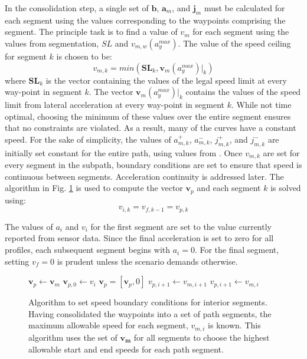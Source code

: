 \documentclass[letterpaper, 10 pt, conference]{ieeeconf}  %
\begin{document}
In the consolidation step, a single set of $\mathbf{b}$, $\mathbf{a}_m$, and $\mathbf{j}_m$ 
must be calculated for each segment using the values corresponding to the waypoints comprising the segment.
The principle task is to find a value of $v_m$ for each segment using the values from segmentation, $SL$ and $v_{m,w}(a_{y}^{max})$. 
The value of the speed ceiling for segment $k$ is chosen to be:
\begin{equation}
  v_{m,k} = min \left ( \mathbf{SL}_k ,  \mathbf{v}_{m}(a_{y}^{max}) |_k \right )
\end{equation}
where $\mathbf{SL}_k$ is the vector containing the values of the legal speed limit at every way-point in segment $k$.
The vector $\mathbf{v}_{m}(a_{y}^{max}) |_k$ contains the values of the speed limit from lateral acceleration at every way-point in segment $k$.
While not time optimal, choosing the minimum of these values over the entire segment ensures that no constraints are violated. As a result, many of the curves have a constant speed.
For the sake of simplicity, the values of $a^+_{m,k}$, $a^-_{m,k}$, $j^+_{m,k}$, and $j^-_{m,k}$ are initially set constant for the entire path, using values from \cite{Maurya2012,Hoberock1977,Long2000}.
Once $v_{m,k}$ are set for every segment in the subpath, boundary conditions are set to ensure that speed is continuous between segments. Acceleration continuity is addressed later.
The algorithm in Fig. \ref{alg:segmentspeedboundaryconditions} is used to compute the vector $\mathbf{v}_p$ and each segment $k$ is solved using:
\begin{equation}
  v_{i,k} = v_{f,k-1} = v_{p,k}
\end{equation}

The values of $a_i$ and $v_i$ for the first segment are set to the value currently reported from sensor data.
Since the final acceleration is set to zero for all profiles, each subsequent segment begins with $a_i = 0$.
For the final segment, setting $v_f = 0$ is prudent unless the scenario demands otherwise.


\begin{figure}
  \begin{algorithmic}[1]
      \State $\mathbf{v}_p \gets \mathbf{v}_m$ 
      \State $\mathbf{v}_{p,0} \gets v_i$ 
      \State $\mathbf{v}_p = [\mathbf{v}_p, 0]$ 
          \State $v_{p,i+1} \gets v_{m,i+1}$
        \Else
          \State $v_{p,i+1} \gets v_{m,i}$
        \EndIf
      \EndFor
    \EndProcedure
  \end{algorithmic}
  \caption{
    Algorithm to set speed boundary conditions for interior segments.
    Having consolidated the waypoints into a set of path segments, the maximum allowable speed for each segment, $v_{m,i}$ is known.
    This algorithm uses the set of $\mathbf{v_{m}}$ for all segments to choose the highest allowable start and end speeds for each path segment.
  }
\label{alg:segmentspeedboundaryconditions}
\end{figure}
\end{document}
